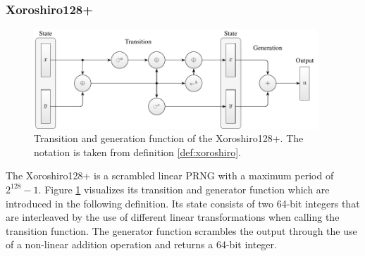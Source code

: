 \documentclass{stdlocal}
\begin{document}


  \subsubsection*{Xoroshiro128+} %
    \begin{figure}
      \center
      \includegraphics[width=0.95\textwidth]{figures/xrsr128p_scheme.pdf}
      \caption[Xoroshiro128+ Transition and Generation]{
        Transition and generation function of the Xoroshiro128+.
        The notation is taken from definition \ref{def:xoroshiro}.
      }
      \label{fig:xoroshiro-transition-generation}
    \end{figure}

    The Xoroshiro128+ is a scrambled linear PRNG with a maximum period of $2^{128}-1$.
    Figure \ref{fig:xoroshiro-transition-generation} visualizes its transition and generator function which are introduced in the following definition.
    Its state consists of two 64-bit integers that are interleaved by the use of different linear transformations when calling the transition function.
    The generator function scrambles the output through the use of a non-linear addition operation and returns a 64-bit integer.
    \autocite{kneusel2018,vigna-xoroshiro}
\end{document}
